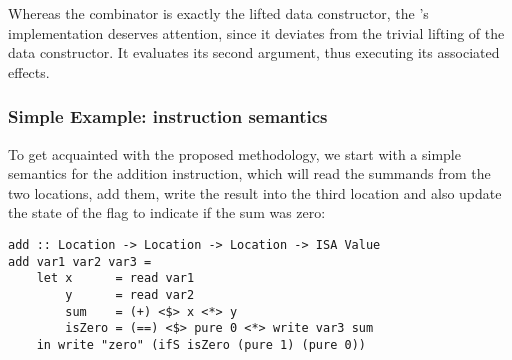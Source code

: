 Whereas the  combinator is exactly the lifted  data constructor, the 's implementation deserves attention, since it deviates from the trivial lifting of
the  data constructor. It evaluates its second argument, thus executing its
associated effects.

\subsubsection{Simple Example:  instruction semantics}

To get acquainted with the proposed methodology, we start with a simple semantics for
the addition instruction, which will read the summands from the two locations, add them,
write the result into the third location and also update the state of the 
flag to indicate if the sum was zero:

\begin{verbatim}
add :: Location -> Location -> Location -> ISA Value
add var1 var2 var3 =
    let x      = read var1
        y      = read var2
        sum    = (+) <$> x <*> y
        isZero = (==) <$> pure 0 <*> write var3 sum
    in write "zero" (ifS isZero (pure 1) (pure 0))
\end{verbatim}











